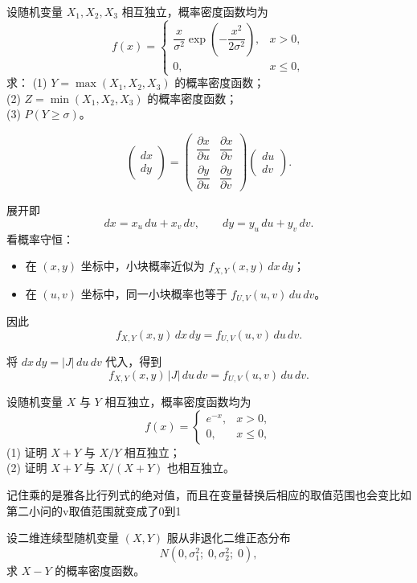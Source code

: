 \begin{homework}[2.60]
设随机变量 $X_1,X_2,X_3$ 相互独立，概率密度函数均为
\[
f(x)=
\begin{cases}
\dfrac{x}{\sigma^2}\exp\!\left(-\dfrac{x^2}{2\sigma^2}\right), & x>0,\\
0, & x\le0,
\end{cases}
\]
求：  
(1) $Y=\max(X_1,X_2,X_3)$ 的概率密度函数；\\
(2) $Z=\min(X_1,X_2,X_3)$ 的概率密度函数；\\
(3) $P(Y\ge\sigma)$。
\end{homework}
\begin{dxtips}
    \[
\begin{pmatrix}dx\\dy\end{pmatrix}
=
\begin{pmatrix}
\dfrac{\partial x}{\partial u} & \dfrac{\partial x}{\partial v}\\[6pt]
\dfrac{\partial y}{\partial u} & \dfrac{\partial y}{\partial v}
\end{pmatrix}
\begin{pmatrix}du\\dv\end{pmatrix}.
\]

展开即
\[
dx=x_u\,du+x_v\,dv,\qquad
dy=y_u\,du+y_v\,dv.
\]
看概率守恒：

\begin{itemize}
  \item 在 $(x,y)$ 坐标中，小块概率近似为
  $f_{X,Y}(x,y)\,dx\,dy$；
  \item 在 $(u,v)$ 坐标中，同一小块概率也等于
  $f_{U,V}(u,v)\,du\,dv$。
\end{itemize}

因此
\[
f_{X,Y}(x,y)\,dx\,dy
=
f_{U,V}(u,v)\,du\,dv.
\]

将
$dx\,dy=|J|\,du\,dv$
代入，得到
\[
f_{X,Y}(x,y)\,|J|\,du\,dv
=
f_{U,V}(u,v)\,du\,dv.
\]
\end{dxtips}
\begin{homework}[2.61]
设随机变量 $X$ 与 $Y$ 相互独立，概率密度函数均为
\[
f(x)=
\begin{cases}
e^{-x}, & x>0,\\[4pt]
0, & x\le0,
\end{cases}
\]
(1) 证明 $X+Y$ 与 $X/Y$ 相互独立；\\
(2) 证明 $X+Y$ 与 $X/(X+Y)$ 也相互独立。
\end{homework}
\begin{dxtips}
    记住乘的是雅各比行列式的绝对值，而且在变量替换后相应的取值范围也会变比如第二小问的v取值范围就变成了0到1
\end{dxtips}
\begin{homework}[2.62]
设二维连续型随机变量 $(X,Y)$ 服从非退化二维正态分布
\[
N(0,\sigma_1^2;\;0,\sigma_2^2;\;0),
\]
求 $X-Y$ 的概率密度函数。
\end{homework}


